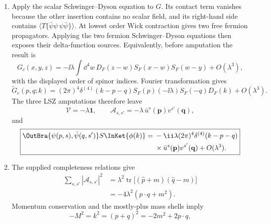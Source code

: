 \begin{enumerate}
\begin{enumerate}
\begin{enumerate}
\[\begin{aligned}
 +R(p,q;k).
 \end{aligned}
\]
Here \(R\) denotes terms missing at least one of the three external
one-particle poles.
LSZ multiplies by the three inverse propagators, takes
\(p^2=q^2=-m^2\), \(k^2=-M^2\), and contracts the fermion residues with
\(\bar u^s(\mathbf p)\) and \(v^{s'}(\mathbf q)\).  Thus, defining the
amputated invariant vertex by \(\Gamma=-\ii\mathcal V\),
\[
 \boxed{\begin{aligned}
 \OutBra{\psi(p,s),\bar\psi(q,s')}S\InKet{\phi(k)}
 &={}\,\ii(2\pi)^4\delta^{(4)}(k-p-q)\mathcal A_{s,s'},\\
 \mathcal A_{s,s'}
 &=\bar u^s(\mathbf p)\mathcal V(p,q;k)v^{s'}(\mathbf q).
 \end{aligned}}
\]
The mode expansions supplied in the prompt fix both the pole residues and
the square-root normalizations in this formula.
\item
Apply the scalar Schwinger--Dyson equation to \(G\).  Its contact term
vanishes because the other insertion contains no scalar field, and its
right-hand side contains
\(\langle T\{\bar\psi\psi\,\psi\bar\psi\}\rangle\).
At lowest order Wick contraction gives two free fermion propagators.
Applying the two fermion Schwinger--Dyson equations then exposes their
delta-function sources.  Equivalently, before amputation the result is
\[
 \boxed{\;
 G_c(x,y,z)
 =-\ii\lambda\int \dd^4w\,
 D_F(z-w)S_F(x-w)S_F(w-y)+O(\lambda^3),\;}
\]
with the displayed order of spinor indices.  Fourier transformation gives
\[
 \widetilde G_c(p,q;k)
 =(2\pi)^4\delta^{(4)}(k-p-q)
 S_F(p)(-\ii\lambda)S_F(-q)D_F(k)+O(\lambda^3).
\]
The three LSZ amputations therefore leave
\[
 \boxed{\mathcal V=-\lambda\mathbf1,\qquad
 \mathcal A_{s,s'}=-\lambda\,
 \bar u^s(\mathbf p)v^{s'}(\mathbf q),}
\]
and
\[
 \boxed{\begin{aligned}
 \OutBra{\psi(p,s),\bar\psi(q,s')}S\InKet{\phi(k)}
 ={}&-\ii\lambda(2\pi)^4\delta^{(4)}(k-p-q)\\
 &\times\bar u^s(\mathbf p)v^{s'}(\mathbf q)+O(\lambda^3).
 \end{aligned}}
\]
\item
The supplied completeness relations give
\[
 \begin{aligned}
 \sum_{s,s'}|\mathcal A_{s,s'}|^2
 &=\lambda^2\operatorname{tr}
 \bigl[(\widehat p+m)(\widehat q-m)\bigr]\\
 &=-4\lambda^2(p\cdot q+m^2).
 \end{aligned}
\]
Momentum conservation and the mostly-plus mass shells imply
\[
 -M^2=k^2=(p+q)^2=-2m^2+2p\cdot q,
\]
\end{enumerate}
\end{enumerate}
\end{enumerate}

